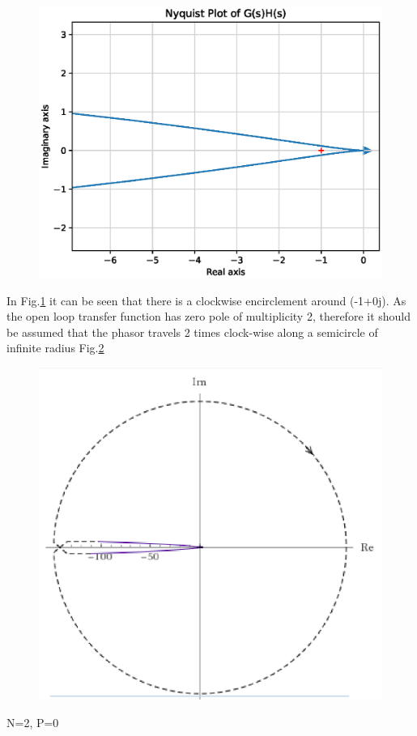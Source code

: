 \begin{enumerate}[label=\thesection.\arabic*.,ref=\thesection.\theenumi]
\begin{figure}[!h]
    \includegraphics[width=\columnwidth]{./figs/ee18btech11041_2.eps}
    \caption{}
    \label{fig:ee18btech11041_fig2}
\end{figure}


In Fig.\ref{fig:ee18btech11041_fig2} it can be seen that there is a clockwise encirclement around (-1+0j).
As the open loop transfer function has zero pole of multiplicity 2, therefore it should be assumed that the phasor travels 2 times clock-wise along a semicircle of infinite radius Fig.\ref{fig:ee18btech11041_fig3} 

\begin{figure}[!h]
    \includegraphics[width=\columnwidth]{./figs/ee18btech11041_3.eps}
    \caption{}
    \label{fig:ee18btech11041_fig3}
\end{figure}
\begin{center}
N=2, P=0    
\end{center}


\end{enumerate}
